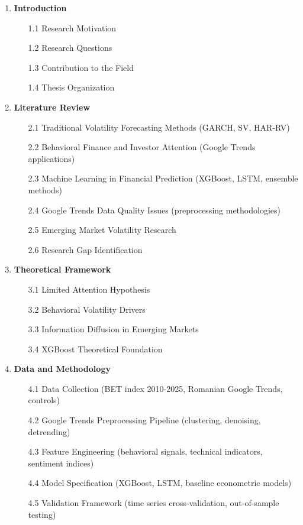 \documentclass[12pt,a4paper]{article}
\begin{document}
\begin{enumerate}
    \item \textbf{Introduction}
    \begin{itemize}
        \item[1.1] Research Motivation
        \item[1.2] Research Questions
        \item[1.3] Contribution to the Field
        \item[1.4] Thesis Organization
    \end{itemize}
    
    \item \textbf{Literature Review}
    \begin{itemize}
        \item[2.1] Traditional Volatility Forecasting Methods (GARCH, SV, HAR-RV)
        \item[2.2] Behavioral Finance and Investor Attention (Google Trends applications)
        \item[2.3] Machine Learning in Financial Prediction (XGBoost, LSTM, ensemble methods)
        \item[2.4] Google Trends Data Quality Issues (preprocessing methodologies)
        \item[2.5] Emerging Market Volatility Research
        \item[2.6] Research Gap Identification
    \end{itemize}
    
    \item \textbf{Theoretical Framework}
    \begin{itemize}
        \item[3.1] Limited Attention Hypothesis
        \item[3.2] Behavioral Volatility Drivers
        \item[3.3] Information Diffusion in Emerging Markets
        \item[3.4] XGBoost Theoretical Foundation
    \end{itemize}
    
    \item \textbf{Data and Methodology}
    \begin{itemize}
        \item[4.1] Data Collection (BET index 2010-2025, Romanian Google Trends, controls)
        \item[4.2] Google Trends Preprocessing Pipeline (clustering, denoising, detrending)
        \item[4.3] Feature Engineering (behavioral signals, technical indicators, sentiment indices)
        \item[4.4] Model Specification (XGBoost, LSTM, baseline econometric models)
        \item[4.5] Validation Framework (time series cross-validation, out-of-sample testing)
    \end{itemize}
    

\end{enumerate}
\end{document}
